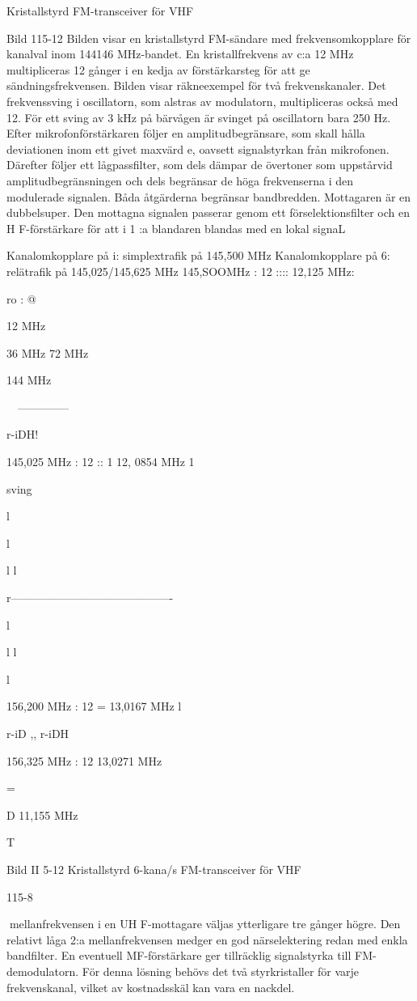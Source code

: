 Kristallstyrd FM-transceiver för VHF

Bild 115-12
Bilden visar en kristallstyrd FM-sändare med
frekvensomkopplare för kanalval inom 144146 MHz-bandet.
En kristallfrekvens av c:a 12 MHz multipliceras 12 gånger i en kedja av förstärkarsteg
för att ge sändningsfrekvensen. Bilden visar
räkneexempel för två frekvenskanaler. Det
frekvenssving i oscillatorn, som alstras av
modulatorn, multipliceras också med 12.
För ett sving av 3 kHz på bärvågen är
svinget på oscillatorn bara 250 Hz.
Efter mikrofonförstärkaren följer en amplitudbegränsare, som skall hålla deviationen inom ett givet maxvärd e, oavsett signalstyrkan från mikrofonen. Därefter följer ett
lågpassfilter, som dels dämpar de övertoner
som uppstårvid amplitudbegränsningen och
dels begränsar de höga frekvenserna i den
modulerade signalen. Båda åtgärderna begränsar bandbredden.
Mottagaren är en dubbelsuper. Den mottagna signalen passerar genom ett förselektionsfilter och en H F-förstärkare för att
i 1 :a blandaren blandas med en lokal signaL

Kanalomkopplare på i: simplextrafik på 145,500 MHz
Kanalomkopplare på 6: relätrafik på 145,025/145,625 MHz
145,SOOMHz : 12 ::::
12,125 MHz:

ro :
@

12 MHz

36 MHz 72 MHz

144 MHz

~~--------------~

r-iDH!

145,025 MHz : 12 :: 1
12, 0854 MHz
1

sving

l

l

l
l

r-------------------------------------------~

l

l
l

l

156,200 MHz : 12 =
13,0167 MHz
l

r-iD ,,
r-iDH

156,325 MHz : 12
13,0271 MHz

=

D 11,155 MHz

T

Bild II 5-12 Kristallstyrd 6-kana/s FM-transceiver för VHF

115-8

mellanfrekvensen i en UH F-mottagare väljas ytterligare tre gånger högre. Den relativt
låga 2:a mellanfrekvensen medger en god
närselektering redan med enkla bandfilter.
En eventuell MF-förstärkare ger tillräcklig
signalstyrka till FM-demodulatorn.
För denna lösning behövs det två styrkristaller för varje frekvenskanal, vilket av
kostnadsskäl kan vara en nackdel.

